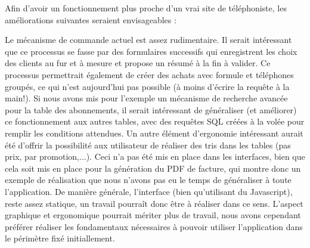 Afin d'avoir un fonctionnement plus proche d'un vrai site de téléphoniste, les améliorations suivantes seraient envisageables :
\begin{itemize}
  Le mécanisme de commande actuel est assez rudimentaire. Il serait intéressant que ce processus se fasse par des formulaires successifs qui enregistrent les choix des clients au fur et à mesure et propose un résumé à la fin à valider. Ce processus permettrait également de créer des achats avec formule et téléphones groupés, ce qui n'est aujourd'hui pas possible (à moins d'écrire la requête à la main!).
  Si nous avons mis pour l'exemple un mécanisme de recherche avancée pour la table des abonnements, il serait intéressant de généraliser (et améliorer) ce fonctionnement aux autres tables, avec des requêtes SQL créées à la volée pour remplir les conditions attendues.
  Un autre élément d'ergonomie intéressant aurait été d'offrir la possibilité aux utilisateur de réaliser des tris dans les tables (pas prix, par promotion,...). Ceci n'a pas été mis en place dans les interfaces, bien que cela soit mis en place pour la génération du PDF de facture, qui montre donc un exemple de réalisation que nous n'avons pas eu le temps de généraliser à toute l'application.
  De manière générale, l'interface (bien qu'utilisant du Javascript), reste assez statique, un travail pourraît donc être à réaliser dans ce sens. L'aspect graphique et ergonomique pourrait mériter plus de travail, nous avons cependant préférer réaliser les fondamentaux nécessaires à pouvoir utiliser l'application dans le périmètre fixé initiallement.
\end{itemize}



